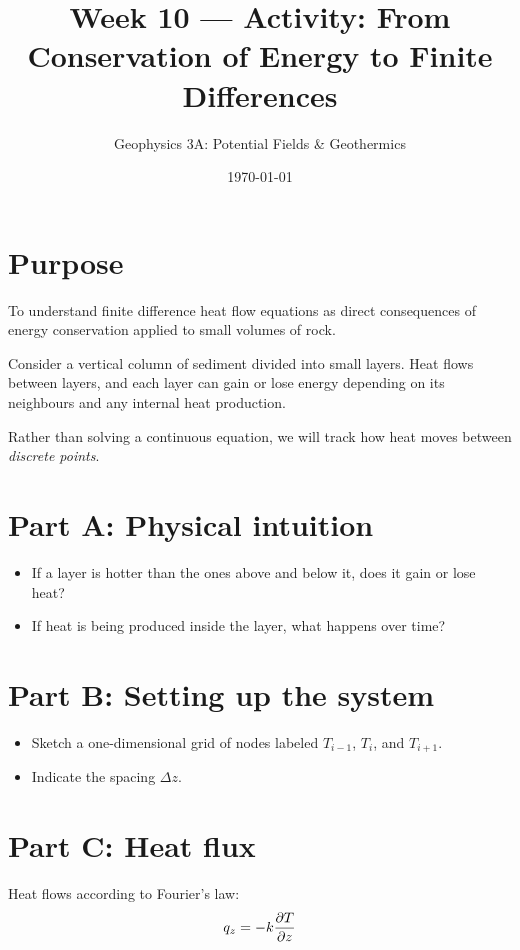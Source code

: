 \documentclass[11pt,a4paper]{article}
\title{Week 10 --- Activity: From Conservation of Energy to Finite Differences}
\author{Geophysics 3A: Potential Fields \& Geothermics}
\date{\today}
\begin{document}
\maketitle

\section*{Purpose}
To understand finite difference heat flow equations as direct consequences of energy conservation applied to small volumes of rock.

Consider a vertical column of sediment divided into small layers. Heat flows between layers, and each layer can gain or lose energy depending on its neighbours and any internal heat production.

Rather than solving a continuous equation, we will track how heat moves between
\emph{discrete points}.

\section*{Part A: Physical intuition}

\begin{itemize}
    \item If a layer is hotter than the ones above and below it, does it gain or lose heat?
    \item If heat is being produced inside the layer, what happens over time?
\end{itemize}

\section*{Part B: Setting up the system}

\begin{itemize}
    \item Sketch a one-dimensional grid of nodes labeled $T_{i-1}$, $T_i$, and $T_{i+1}$.
    \item Indicate the spacing $\Delta z$.
\end{itemize}

\section*{Part C: Heat flux}

Heat flows according to Fourier's law:
\begin{equation}
    q_z = -k \pdv{T}{z}
\end{equation}
\end{document}
